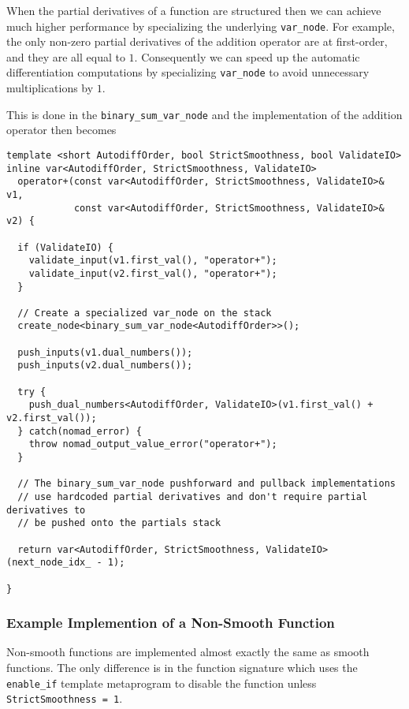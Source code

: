 When the partial derivatives of a function are structured then we can achieve
much higher performance by specializing the underlying \verb|var_node|.
For example, the only non-zero partial derivatives of the addition operator
are at first-order, and they are all equal to $1$.  Consequently we can speed
up the automatic differentiation computations by specializing \verb|var_node|
to avoid unnecessary multiplications by $1$.

This is done in the \verb|binary_sum_var_node| and the implementation of
the addition operator then becomes
%
\begin{verbatim}
template <short AutodiffOrder, bool StrictSmoothness, bool ValidateIO>
inline var<AutodiffOrder, StrictSmoothness, ValidateIO>
  operator+(const var<AutodiffOrder, StrictSmoothness, ValidateIO>& v1,
            const var<AutodiffOrder, StrictSmoothness, ValidateIO>& v2) {

  if (ValidateIO) {
    validate_input(v1.first_val(), "operator+");
    validate_input(v2.first_val(), "operator+");
  }
      
  // Create a specialized var_node on the stack
  create_node<binary_sum_var_node<AutodiffOrder>>();
    
  push_inputs(v1.dual_numbers());
  push_inputs(v2.dual_numbers());
    
  try {
    push_dual_numbers<AutodiffOrder, ValidateIO>(v1.first_val() + v2.first_val());
  } catch(nomad_error) {
    throw nomad_output_value_error("operator+");
  }
    
  // The binary_sum_var_node pushforward and pullback implementations
  // use hardcoded partial derivatives and don't require partial derivatives to 
  // be pushed onto the partials stack
    
  return var<AutodiffOrder, StrictSmoothness, ValidateIO>(next_node_idx_ - 1);
    
}
\end{verbatim}

\subsubsection{Example Implemention of a Non-Smooth Function}

Non-smooth functions are implemented almost exactly the same as smooth functions.
The only difference is in the function signature which uses the \verb|enable_if|
template metaprogram to disable the function unless \verb|StrictSmoothness = 1|.

